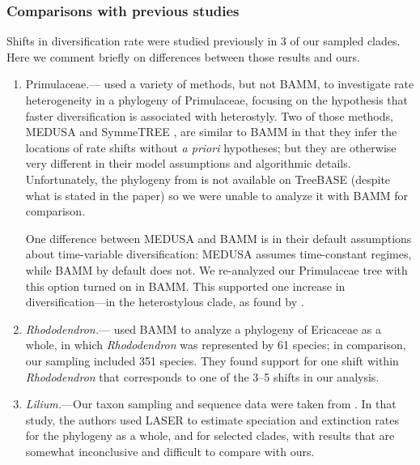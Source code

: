 \subsubsection*{Comparisons with previous studies}

Shifts in diversification rate were studied previously in 3 of our
sampled clades. Here we comment briefly on differences between those
results and ours.

\begin{enumerate}%

\item Primulaceae.---\citet{deVos2014} used a variety of methods, but
  not BAMM, to investigate rate heterogeneity in a phylogeny of
  Primulaceae, focusing on the hypothesis that faster diversification
  is associated with heterostyly. Two of those methods, MEDUSA
  \citep{alfaro2009} and SymmeTREE \citep{chan2005}, are similar to
  BAMM in that they infer the locations of rate shifts without
  \textit{a priori} hypotheses; but they are otherwise very different
  in their model assumptions and algorithmic details. Unfortunately,
  the phylogeny from \citet{deVos2014} is not available on TreeBASE
  (despite what is stated in the paper) so we were unable to analyze
  it with BAMM for comparison.

  One difference between MEDUSA and BAMM is in their default
  assumptions about time-variable diversification: MEDUSA assumes
  time-constant regimes, while BAMM by default does not. We
  re-analyzed our Primulaceae tree with this option turned on in
  BAMM. This supported one increase in diversification---in the
  heterostylous clade, as found by \citet{deVos2014}.

\item \textit{Rhododendron.}---\citet{Schwery2015} used BAMM to
  analyze a phylogeny of Ericaceae as a whole, in which
  \textit{Rhododendron} was represented by 61 species; in comparison,
  our sampling included 351 species. They found support for one shift
  within \textit{Rhododendron} that corresponds to one of the 3--5
  shifts in our analysis.

\item \textit{Lilium.}---Our taxon sampling and sequence data were
  taken from \citet{gao2013}. In that study, the authors used LASER
  \citep{rabosky2007} to estimate speciation and extinction rates for
  the phylogeny as a whole, and for selected clades, with results that
  are somewhat inconclusive and difficult to compare with ours.
\end{enumerate}


\clearpage
\newpage

\clearpage
\newpage


